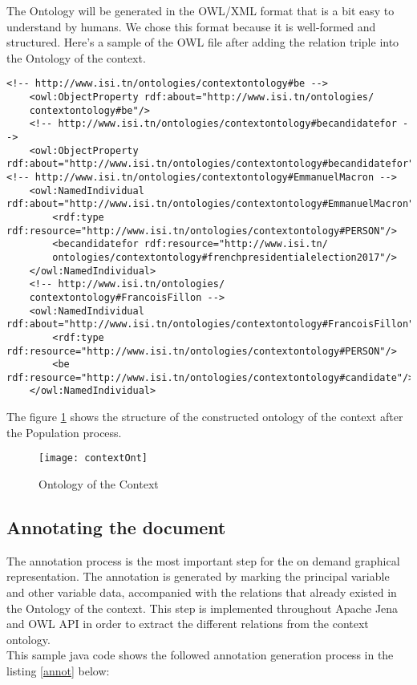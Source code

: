 The Ontology will be generated in the OWL/XML format that is a bit easy to understand by humans. We chose this format because it is well-formed and structured. Here's a sample of the OWL file after adding the  relation triple into the Ontology of the context. \\


\begin{lstlisting}[captionpos=b, caption=Ontology of the context OWL/XML result, label={consteu},
basicstyle=\footnotesize,frame=none]
    <!-- http://www.isi.tn/ontologies/contextontology#be -->
    <owl:ObjectProperty rdf:about="http://www.isi.tn/ontologies/
    contextontology#be"/>   
    <!-- http://www.isi.tn/ontologies/contextontology#becandidatefor -->
    <owl:ObjectProperty rdf:about="http://www.isi.tn/ontologies/contextontology#becandidatefor"/>
<!-- http://www.isi.tn/ontologies/contextontology#EmmanuelMacron -->
    <owl:NamedIndividual rdf:about="http://www.isi.tn/ontologies/contextontology#EmmanuelMacron">
        <rdf:type rdf:resource="http://www.isi.tn/ontologies/contextontology#PERSON"/>
        <becandidatefor rdf:resource="http://www.isi.tn/
        ontologies/contextontology#frenchpresidentialelection2017"/>
    </owl:NamedIndividual>
    <!-- http://www.isi.tn/ontologies/
    contextontology#FrancoisFillon -->
    <owl:NamedIndividual rdf:about="http://www.isi.tn/ontologies/contextontology#FrancoisFillon">
        <rdf:type rdf:resource="http://www.isi.tn/ontologies/contextontology#PERSON"/>
        <be rdf:resource="http://www.isi.tn/ontologies/contextontology#candidate"/>
    </owl:NamedIndividual>     
\end{lstlisting}

The figure \ref{graphonto} shows the structure of the constructed ontology of the context after the Population process.

\begin{figure}[H]
\centering
\texttt{[image: contextOnt]}
\caption{Ontology of the Context}
\label{graphonto}
\end{figure}

\subsection{Annotating the document}

The annotation process is the most important step for the on demand graphical representation. The annotation is generated by marking the principal variable and other variable data, accompanied with the relations that already existed in the Ontology of the context. This step is implemented throughout Apache Jena and OWL API in order to extract the different relations from the context ontology.\\ 
This sample java code shows the followed annotation generation process in the listing \ref{annot} below:


